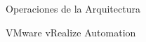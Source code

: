 \begin{subsection}{Operaciones de la Arquitectura}
\begin{subsubsection}{VMware vRealize Automation}


    \end{subsubsection}

    
\end{subsection}